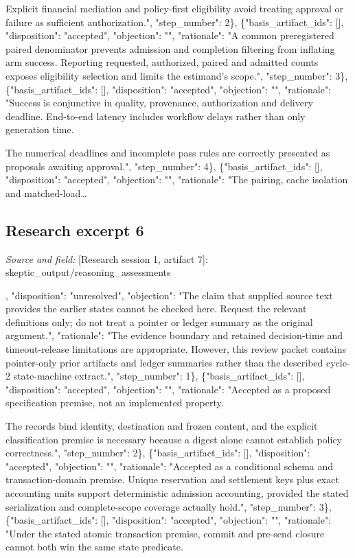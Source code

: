 \documentclass[11pt]{article}
\begin{document}
Explicit financial mediation and policy-first eligibility avoid treating approval or failure as sufficient authorization.", "step\_number": 2\}, \{"basis\_artifact\_ids": [], "disposition": "accepted", "objection": "", "rationale": "A common preregistered paired denominator prevents admission and completion filtering from inflating arm success. Reporting requested, authorized, paired and admitted counts exposes eligibility selection and limits the estimand's scope.", "step\_number": 3\}, \{"basis\_artifact\_ids": [], "disposition": "accepted", "objection": "", "rationale": "Success is conjunctive in quality, provenance, authorization and delivery deadline. End-to-end latency includes workflow delays rather than only generation time.

The numerical deadlines and incomplete pass rules are correctly presented as proposals awaiting approval.", "step\_number": 4\}, \{"basis\_artifact\_ids": [], "disposition": "accepted", "objection": "", "rationale": "The pairing, cache isolation and matched-load\ldots{}

\subsection{Research excerpt 6}
\textit{Source and field: }[Research session 1, artifact 7]: skeptic\_output/reasoning\_assessments\par
[\{"basis\_artifact\_ids": [], "disposition": "unresolved", "objection": "The claim that supplied source text provides the earlier states cannot be checked here. Request the relevant definitions only; do not treat a pointer or ledger summary as the original argument.", "rationale": "The evidence boundary and retained decision-time and timeout-release limitations are appropriate. However, this review packet contains pointer-only prior artifacts and ledger summaries rather than the described cycle-2 state-machine extract.", "step\_number": 1\}, \{"basis\_artifact\_ids": [], "disposition": "accepted", "objection": "", "rationale": "Accepted as a proposed specification premise, not an implemented property.

The records bind identity, destination and frozen content, and the explicit classification premise is necessary because a digest alone cannot establish policy correctness.", "step\_number": 2\}, \{"basis\_artifact\_ids": [], "disposition": "accepted", "objection": "", "rationale": "Accepted as a conditional schema and transaction-domain premise. Unique reservation and settlement keys plus exact accounting units support deterministic admission accounting, provided the stated serialization and complete-scope coverage actually hold.", "step\_number": 3\}, \{"basis\_artifact\_ids": [], "disposition": "accepted", "objection": "", "rationale": "Under the stated atomic transaction premise, commit and pre-send closure cannot both win the same state predicate.
\end{document}
